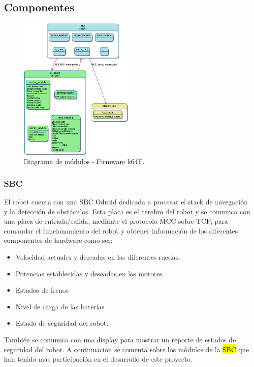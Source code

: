 \documentclass[withindex,glossary]{cam-thesis}
\begin{document}
\subsection{Componentes}

\begin{figure}[H]
\centering
\includegraphics[width=0.5\textwidth]{images/DM3_Modules}
\caption[Diagrama de componentes de módulos]{Diagrama de módulos - Firmware k64F.}
\end{figure}

\subsubsection{SBC}
El robot cuenta con una \gls{SBC} Odroid dedicada a procesar el stack de navegación y la detección de obstáculos. Esta placa es el cerebro del robot y se comunica con una placa de entrada/salida, mediante el protocolo MCC sobre TCP, para comandar el funcionamiento del robot y obtener información de los diferentes componentes de hardware como ser: 
\begin{itemize}
	\item Velocidad actuales y deseadas en las diferentes ruedas.
	\item Potencias establecidas y deseadas en los motores.
	\item Estados de frenos
	\item Nivel de carga de las baterías
	\item Estado de seguridad del robot.
\end{itemize}

También se comunica con una display para mostrar un reporte de estados de seguridad del robot.
A continuación se comenta sobre los módulos de la \hl{SBC} que han tenido más participación en el desarrollo de este proyecto.
\end{document}
